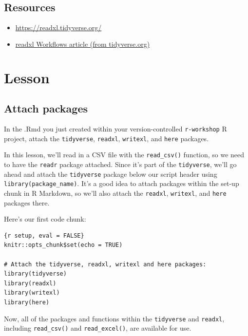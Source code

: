 \documentclass[]{book}
\providecommand{\tightlist}{%
  \setlength{\itemsep}{0pt}\setlength{\parskip}{0pt}}
\begin{document}
\hypertarget{resources-3}{%
\subsection{Resources}\label{resources-3}}

\begin{itemize}
\tightlist
\item
  \url{https://readxl.tidyverse.org/}
\item
  \href{https://readxl.tidyverse.org/articles/articles/readxl-workflows.html}{readxl Workflows article (from tidyverse.org)}
\end{itemize}

\hypertarget{lesson}{%
\section{Lesson}\label{lesson}}

\hypertarget{attach-packages}{%
\subsection{Attach packages}\label{attach-packages}}

In the .Rmd you just created within your version-controlled \texttt{r-workshop} R project, attach the \texttt{tidyverse}, \texttt{readxl}, \texttt{writexl}, and \texttt{here} packages.

In this lesson, we'll read in a CSV file with the \texttt{read\_csv()} function, so we need to have the \texttt{readr} package attached. Since it's part of the \texttt{tidyverse}, we'll go ahead and attach the \texttt{tidyverse} package below our script header using \texttt{library(package\_name)}. It's a good idea to attach packages within the set-up chunk in R Markdown, so we'll also attach the \texttt{readxl}, \texttt{writexl}, and \texttt{here} packages there.

Here's our first code chunk:

\begin{verbatim}
{r setup, eval = FALSE}
knitr::opts_chunk$set(echo = TRUE)

# Attach the tidyverse, readxl, writexl and here packages:
library(tidyverse)
library(readxl)
library(writexl)
library(here)
\end{verbatim}

Now, all of the packages and functions within the \texttt{tidyverse} and \texttt{readxl}, including \texttt{read\_csv()} and \texttt{read\_excel()}, are available for use.
\end{document}
